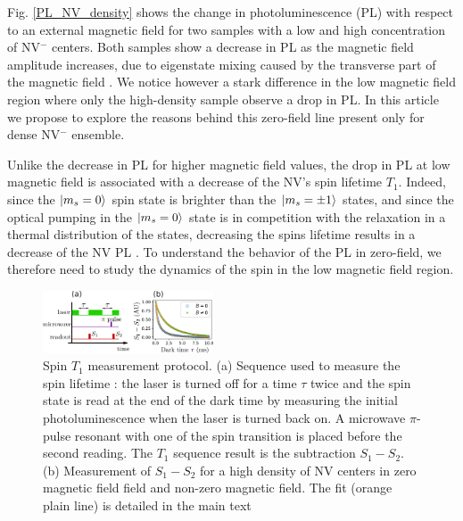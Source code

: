 \documentclass[preprintnumbers,amsmath,amssymb,superscriptaddress,twocolumn,showpacs]{revtex4-2}
\begin{document}
Fig. \ref{PL_NV_density} shows the change in photoluminescence (PL) with respect to an external magnetic field for two samples with a low and high concentration of NV$^-$ centers. Both samples show a decrease in PL as the magnetic field amplitude increases, due to eigenstate mixing caused by the transverse part of the magnetic field \citep{epstein2005anisotropic,lai2009influence}. We notice however a stark difference in the low magnetic field region where only the high-density sample observe a drop in PL. In this article we propose to explore the reasons behind this zero-field line present only for dense NV$^-$ ensemble.

Unlike the decrease in PL for higher magnetic field values, the drop in PL at low magnetic field is associated with a decrease of the NV's spin lifetime $T_1$. Indeed, since the $\ket{m_s=0}$ spin state is brighter than the $\ket{m_s=\pm 1}$ states, and since the optical pumping in the $\ket{m_s=0}$ state is in competition with the relaxation in a thermal distribution of the states, decreasing the spins lifetime results in a decrease of the NV PL \citep{finco2021imaging}. To understand the behavior of the PL in zero-field, we therefore need to study the dynamics of the spin in the low magnetic field region.

\begin{figure}
\includegraphics[width=0.45\textwidth]{Figures/fig T1}
\caption{Spin $T_1$ measurement protocol. (a) Sequence used to measure the spin lifetime : the laser is turned off for a time $\tau$ twice and the spin state is read at the end of the dark time by measuring the initial photoluminescence when the laser is turned back on. A microwave $\pi$-pulse resonant with one of the spin transition is placed before the second reading. The  $T_1$ sequence result is the subtraction $S_1-S_2$. (b) Measurement of $S_1-S_2$ for a high density of NV centers in zero magnetic field field and non-zero magnetic field. The fit (orange plain line) is detailed in the main text}
\label{T1}
\end{figure}
\end{document}
